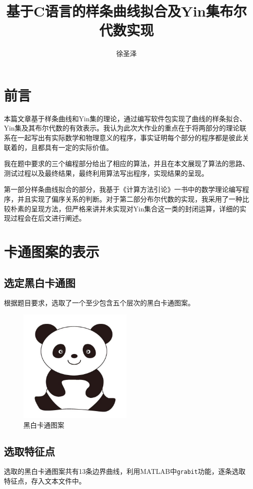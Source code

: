 \documentclass{article}
\title{基于C语言的样条曲线拟合及Yin集布尔代数实现}
\author{徐圣泽}
\begin{document}
	
	\maketitle

	\section{前言}
	本篇文章基于样条曲线和Yin集的理论，通过编写软件包实现了曲线的样条拟合、Yin集及其布尔代数的有效表示。我认为此次大作业的重点在于将两部分的理论联系在一起写出有实际数学和物理意义的程序，事实证明每个部分的程序都是彼此关联着的，且都具有一定的实际价值。
	
	我在题中要求的三个编程部分给出了相应的算法，并且在本文展现了算法的思路、测试过程以及最终结果，最终利用算法写出程序，实现结果的呈现。
	
	第一部分样条曲线拟合的部分，我基于《计算方法引论》一书中的数学理论编写程序，并且实现了偏序关系的判断。对于第二部分布尔代数的实现，我采用了一种比较朴素的呈现方法，但严格来讲并未实现对Yin集合这一类的封闭运算，详细的实现过程会在后文进行阐述。
	\section{卡通图案的表示}
	\subsection{选定黑白卡通图}
	根据题目要求，选取了一个至少包含五个层次的黑白卡通图案。
	\begin{figure}[h]
		\centering
		\includegraphics[width=0.5\textwidth]{panda.jpeg}
		\caption{黑白卡通图案}
	\end{figure}
	\subsection{选取特征点}
	选取的黑白卡通图案共有13条边界曲线，利用MATLAB中\verb|grabit|功能，逐条选取特征点，存入文本文件中。
\end{document}
